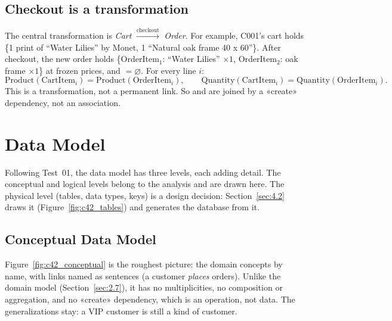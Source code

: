 \subsection{Checkout is a transformation}

The central transformation is \emph{Cart} $\xrightarrow{\text{checkout}}$ \emph{Order}. For example, C001's cart
holds \{1 print of ``Water Lilies'' by Monet, 1 ``Natural oak frame 40 x 60''\}. After checkout, the new order holds
\{OrderItem$_1$: ``Water Lilies'' $\times 1$, OrderItem$_2$: oak frame $\times 1$\} at frozen prices, and
 $= \varnothing$. For every line $i$:
\[
\mathrm{Product}(\mathrm{CartItem}_i) = \mathrm{Product}(\mathrm{OrderItem}_i), \qquad
\mathrm{Quantity}(\mathrm{CartItem}_i) = \mathrm{Quantity}(\mathrm{OrderItem}_i).
\]
This is a transformation, not a permanent link. So  and  are joined by a «create»
dependency, not an association.


\section{Data Model}\label{sec:2.dm}

Following Test~01, the data model has three levels, each adding detail. The conceptual and logical levels belong
to the analysis and are drawn here. The physical level (tables, data types, keys) is a design decision:
Section~\ref{sec:4.2} draws it (Figure~\ref{fig:c42_tables}) and generates the database from it.

\subsection{Conceptual Data Model}\label{sec:2.dm.1}

Figure~\ref{fig:c42_conceptual} is the roughest picture: the \nAnalysisClasses{} domain concepts by name, with
links named as sentences (a customer \emph{places} orders). Unlike the domain model (Section~\ref{sec:2.7}), it has
no multiplicities, no composition or aggregation, and no «create» dependency, which is an operation, not data. The
generalizations stay: a VIP customer is still a kind of customer.


